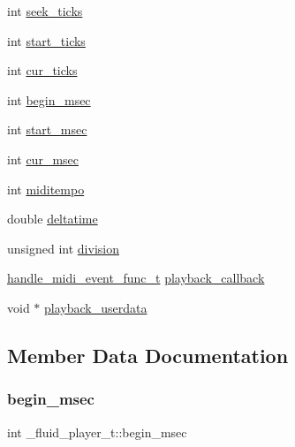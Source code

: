 \begin{DoxyCompactItemize}
\item 
int \hyperlink{struct__fluid__player__t_ae71541ce6fa75f76f382221d6b0764bd}{seek\+\_\+ticks}
\item 
int \hyperlink{struct__fluid__player__t_a21a6867f589eb2fc5c0a0abcb2f8f605}{start\+\_\+ticks}
\item 
int \hyperlink{struct__fluid__player__t_a4725f623cdfc3cdeb414987efdadeb91}{cur\+\_\+ticks}
\item 
int \hyperlink{struct__fluid__player__t_a0360723080a5aa6bb8ef40297f2e6731}{begin\+\_\+msec}
\item 
int \hyperlink{struct__fluid__player__t_a9e7279464f9a3e6c72dc286c8d86ca3f}{start\+\_\+msec}
\item 
int \hyperlink{struct__fluid__player__t_a341f5879916084630d4e73efb3d96857}{cur\+\_\+msec}
\item 
int \hyperlink{struct__fluid__player__t_a9479639aa40bb89fb7f6815ea2b074bd}{miditempo}
\item 
double \hyperlink{struct__fluid__player__t_aab444ebcc6b1f0a3ddb73b4357a9d28e}{deltatime}
\item 
unsigned int \hyperlink{struct__fluid__player__t_ab0ff4918454c4ade622abb56cee55457}{division}
\item 
\hyperlink{midi_8h_a42c3752e3adb54e0af802131c36a1129}{handle\+\_\+midi\+\_\+event\+\_\+func\+\_\+t} \hyperlink{struct__fluid__player__t_a247a7bb54c4b0491762dc047c6ad4dbc}{playback\+\_\+callback}
\item 
void $\ast$ \hyperlink{struct__fluid__player__t_ae932ebf90f25f41ec34cb5b20e553941}{playback\+\_\+userdata}
\end{DoxyCompactItemize}


\subsection{Member Data Documentation}
\mbox{\label{struct__fluid__player__t_a0360723080a5aa6bb8ef40297f2e6731}} 
\subsubsection{\texorpdfstring{begin\+\_\+msec}{begin\_msec}}
{\footnotesize\ttfamily int \+\_\+fluid\+\_\+player\+\_\+t\+::begin\+\_\+msec}


